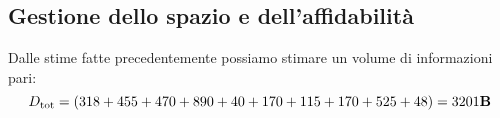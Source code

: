 \subsection{Gestione dello spazio e dell'affidabilità}
Dalle stime fatte precedentemente possiamo stimare un volume di informazioni pari:
\begin{equation}
  D_{\text{tot}}=(318+455+470+890+40+170+115+170+525+48)= 3201\text{\textbf{B}}\\
\end{equation}

